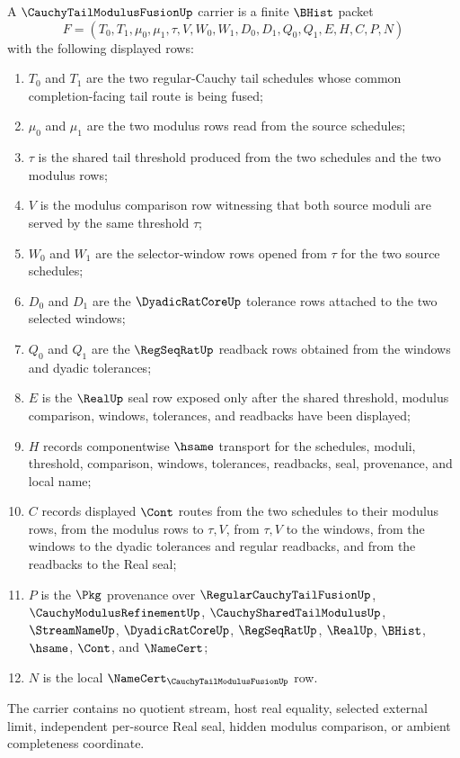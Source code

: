 \begin{definition}
\label{def:cauchy-tail-modulus-fusion-carrier}
A $\CauchyTailModulusFusionUp$ carrier is a finite $\BHist$ packet
$$
F=(T_0,T_1,\mu_0,\mu_1,\tau,V,W_0,W_1,D_0,D_1,Q_0,Q_1,E,H,C,P,N)
$$
with the following displayed rows:
\begin{enumerate}
\item $T_0$ and $T_1$ are the two regular-Cauchy tail schedules whose common completion-facing tail route is being fused;
\item $\mu_0$ and $\mu_1$ are the two modulus rows read from the source schedules;
\item $\tau$ is the shared tail threshold produced from the two schedules and the two modulus rows;
\item $V$ is the modulus comparison row witnessing that both source moduli are served by the same threshold $\tau$;
\item $W_0$ and $W_1$ are the selector-window rows opened from $\tau$ for the two source schedules;
\item $D_0$ and $D_1$ are the $\DyadicRatCoreUp$ tolerance rows attached to the two selected windows;
\item $Q_0$ and $Q_1$ are the $\RegSeqRatUp$ readback rows obtained from the windows and dyadic tolerances;
\item $E$ is the $\RealUp$ seal row exposed only after the shared threshold, modulus comparison, windows, tolerances, and readbacks have been displayed;
\item $H$ records componentwise $\hsame$ transport for the schedules, moduli, threshold, comparison, windows, tolerances, readbacks, seal, provenance, and local name;
\item $C$ records displayed $\Cont$ routes from the two schedules to their modulus rows, from the modulus rows to $\tau,V$, from $\tau,V$ to the windows, from the windows to the dyadic tolerances and regular readbacks, and from the readbacks to the Real seal;
\item $P$ is the $\Pkg$ provenance over $\RegularCauchyTailFusionUp$, $\CauchyModulusRefinementUp$, $\CauchySharedTailModulusUp$, $\StreamNameUp$, $\DyadicRatCoreUp$, $\RegSeqRatUp$, $\RealUp$, $\BHist$, $\hsame$, $\Cont$, and $\NameCert$;
\item $N$ is the local $\NameCert_{\CauchyTailModulusFusionUp}$ row.
\end{enumerate}
The carrier contains no quotient stream, host real equality, selected external limit, independent per-source Real seal, hidden modulus comparison, or ambient completeness coordinate.
\end{definition}

